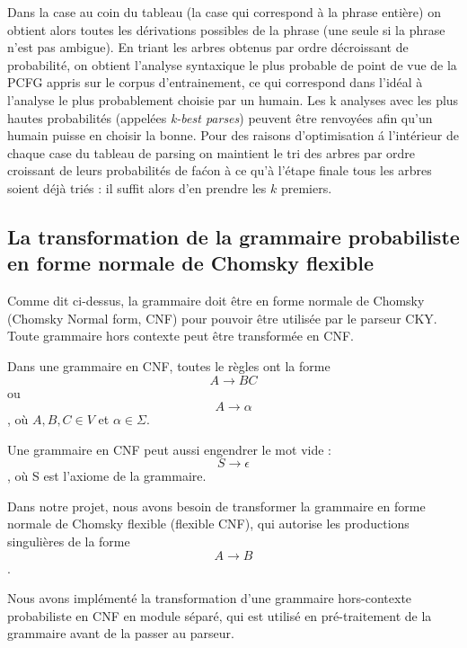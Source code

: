 \documentclass[12pt]{article}
\begin{document}
Dans la case au coin du tableau (la case qui correspond \`a la phrase enti\`ere) on
obtient alors toutes les d\'erivations possibles de la phrase (une seule si la
phrase n'est pas ambigue). En triant les arbres obtenus par ordre d\'ecroissant de
probabilit\'e, on obtient l'analyse syntaxique le plus probable de point de vue
de la PCFG appris sur le corpus d'entrainement, ce qui correspond dans l'id\'eal 
\`a l'analyse le plus probablement choisie par un humain.
Les k analyses avec les plus hautes probabilit\'es (appel\'ees \textit{k-best parses}) peuvent \^etre renvoy\'ees afin qu'un humain
puisse en choisir la bonne. Pour des raisons d'optimisation \'a l'int\'erieur de chaque case
du tableau de parsing on maintient le tri des arbres par ordre croissant de leurs probabilit\'es
de fa\'con \`a ce qu'\`a l'\'etape finale tous les arbres soient d\'ej\`a tri\'es : il suffit alors d'en prendre
les $k$ premiers.


\subsection{La transformation de la grammaire probabiliste en forme normale de Chomsky flexible}

Comme dit ci-dessus, la grammaire doit \^etre en forme normale de Chomsky
(Chomsky Normal form, CNF) pour pouvoir \^etre utilis\'ee par le parseur CKY. Toute
grammaire hors contexte peut \^etre transform\'ee en CNF. \par

Dans une grammaire en
CNF, toutes le r\`egles ont la forme $$A \rightarrow BC$$ ou $$A \rightarrow
\alpha$$, o\`u $A,B,C \in V$ et $\alpha \in \Sigma$. \par

Une grammaire en CNF peut
aussi engendrer le mot vide : $$S \rightarrow \epsilon$$, o\`u S est l'axiome de
la grammaire. 

Dans notre projet, nous avons besoin de transformer la grammaire en forme
normale de Chomsky flexible (flexible CNF), qui autorise les productions
singuli\`eres de la forme $$A \rightarrow B$$. \par

Nous avons impl\'ement\'e la transformation d'une grammaire hors-contexte probabiliste en CNF en
module s\'epar\'e, qui est utilis\'e en pr\'e-traitement de la grammaire avant
de la passer au parseur.
\end{document}
